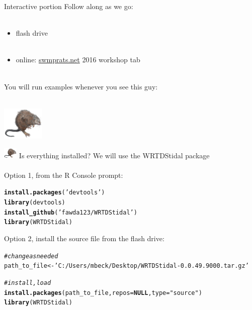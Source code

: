 \documentclass[xcolor=dvipsnames,serif]{beamer}\usepackage[]{graphicx}\usepackage[]{color}
\makeatletter
\newcommand{\hlstr}[1]{\textcolor[rgb]{0.192,0.494,0.8}{#1}}%
\newcommand{\hlcom}[1]{\textcolor[rgb]{0.678,0.584,0.686}{\textit{#1}}}%
\newcommand{\hlstd}[1]{\textcolor[rgb]{0.345,0.345,0.345}{#1}}%
\newcommand{\hlkwa}[1]{\textcolor[rgb]{0.161,0.373,0.58}{\textbf{#1}}}%
\newcommand{\hlkwb}[1]{\textcolor[rgb]{0.69,0.353,0.396}{#1}}%
\newcommand{\hlkwc}[1]{\textcolor[rgb]{0.333,0.667,0.333}{#1}}%
\newcommand{\hlkwd}[1]{\textcolor[rgb]{0.737,0.353,0.396}{\textbf{#1}}}%
\newenvironment{kframe}{%
 \def\at@end@of@kframe{}%
 \ifinner\ifhmode%
  \def\at@end@of@kframe{\end{minipage}}%
  \begin{minipage}{\columnwidth}%
 \fi\fi%
 \def\FrameCommand##1{\hskip\@totalleftmargin \hskip-\fboxsep
 \colorbox{shadecolor}{##1}\hskip-\fboxsep
     \hskip-\linewidth \hskip-\@totalleftmargin \hskip\columnwidth}%
 \MakeFramed {\advance\hsize-\width
   \@totalleftmargin\z@ \linewidth\hsize
   \@setminipage}}%
 {\par\unskip\endMakeFramed%
 \at@end@of@kframe}
\newenvironment{knitrout}{}{} %
\makeatother
\begin{document}
\begin{frame}{Interactive portion}
\onslide<+->
Follow along as we go:\\~\\
\begin{itemize}
\item flash drive\\~\\
\item online: \href{http://swmprats.net/}{swmprats.net} 2016 workshop tab \\~\\
\end{itemize}
\onslide<+->
You will run examples whenever you see this guy: \\~\\
\centerline{\includegraphics[width = 0.15\textwidth]{imgs/swmprat.png}} 
\end{frame}

\begin{frame}[fragile]{\includegraphics[width = 0.05\textwidth]{imgs/swmprat.png} Is everything installed?}
We will use the WRTDStidal package \\~\\
Option 1, from the R Console prompt:
\begin{knitrout}\scriptsize
{}\color{fgcolor}\begin{kframe}
\begin{alltt}
\hlkwd{install.packages}\hlstd{(}\hlstr{'devtools'}\hlstd{)}
\hlkwd{library}\hlstd{(devtools)}
\hlkwd{install_github}\hlstd{(}\hlstr{'fawda123/WRTDStidal'}\hlstd{)}
\hlkwd{library}\hlstd{(WRTDStidal)}
\end{alltt}
\end{kframe}
\end{knitrout}
\vspace{0.1in}
Option 2, install the source file from the flash drive:
\begin{knitrout}\scriptsize
{}\color{fgcolor}\begin{kframe}
\begin{alltt}
\hlcom{# change as needed}
\hlstd{path_to_file} \hlkwb{<-} \hlstr{'C:/Users/mbeck/Desktop/WRTDStidal-0.0.49.9000.tar.gz'}

\hlcom{# install, load}
\hlkwd{install.packages}\hlstd{(path_to_file,} \hlkwc{repos} \hlstd{=} \hlkwa{NULL}\hlstd{,} \hlkwc{type}\hlstd{=}\hlstr{"source"}\hlstd{)}
\hlkwd{library}\hlstd{(WRTDStidal)}
\end{alltt}
\end{kframe}
\end{knitrout}
\end{frame}
\end{document}
